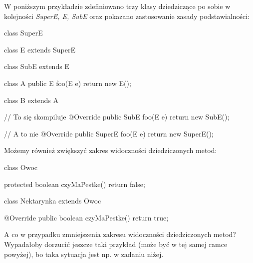 \begin{example}
    W poniższym przykładzie zdefiniowano trzy klasy dziedziczące po sobie w kolejności \textit{SuperE, E, SubE} oraz pokazano zastosowanie zasady podstawialności:
    \begin{java}
        class SuperE {}
    
        class E extends SuperE {}
    
        class SubE extends E {}
    
        class A {
            public E foo(E e) {
                return new E();
            }
        }
    
        class B extends A {
    
            // To się skompiluje
            @Override
            public SubE foo(E e) {
                return new SubE();
            }
    
            // A to nie
            @Override
            public SuperE foo(E e) {
                return new SuperE();
            }
        }
    \end{java}
\end{example}

\begin{example}
    Możemy również zwiększyć zakres widoczności dziedziczonych metod:
    \begin{java}
        class Owoc {

            protected boolean czyMaPestke() {
                return false;
            }
        }

        class Nektarynka extends Owoc {
        
            @Override
            public boolean czyMaPestke() {
                return true;
            }
        }
    \end{java}
\end{example}

\begin{editorsnote}
    A co w przypadku zmniejszenia zakresu widoczności dziedziczonych metod? Wypadałoby dorzucić jeszcze taki przykład (może być w tej samej ramce powyżej), bo taka sytuacja jest np. w zadaniu niżej.
\end{editorsnote}

